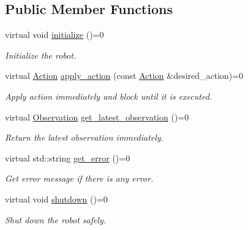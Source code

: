 \subsection*{Public Member Functions}
\begin{DoxyCompactItemize}
\item 
virtual void \hyperlink{classrobot__interfaces_1_1RobotDriver_af3cbef570a455e1f8085d701282264ff}{initialize} ()=0
\begin{DoxyCompactList}\small\item\em Initialize the robot. \end{DoxyCompactList}\item 
virtual \hyperlink{classAction}{Action} \hyperlink{classrobot__interfaces_1_1RobotDriver_a4294e522fcd12b38d69f7d53fae5d74a}{apply\+\_\+action} (const \hyperlink{classAction}{Action} \&desired\+\_\+action)=0
\begin{DoxyCompactList}\small\item\em Apply action immediately and block until it is executed. \end{DoxyCompactList}\item 
virtual \hyperlink{classObservation}{Observation} \hyperlink{classrobot__interfaces_1_1RobotDriver_ad13d4f4fdfe78bdde4fc964f07fa45e2}{get\+\_\+latest\+\_\+observation} ()=0
\begin{DoxyCompactList}\small\item\em Return the latest observation immediately. \end{DoxyCompactList}\item 
virtual std\+::string \hyperlink{classrobot__interfaces_1_1RobotDriver_acdf4c5d6993b836a180e6b6fc12b3445}{get\+\_\+error} ()=0
\begin{DoxyCompactList}\small\item\em Get error message if there is any error. \end{DoxyCompactList}\item 
virtual void \hyperlink{classrobot__interfaces_1_1RobotDriver_a3451fb8b15d2840b559f3ee858de01f8}{shutdown} ()=0\hypertarget{classrobot__interfaces_1_1RobotDriver_a3451fb8b15d2840b559f3ee858de01f8}{}\label{classrobot__interfaces_1_1RobotDriver_a3451fb8b15d2840b559f3ee858de01f8}

\begin{DoxyCompactList}\small\item\em Shut down the robot safely. \end{DoxyCompactList}\end{DoxyCompactItemize}


